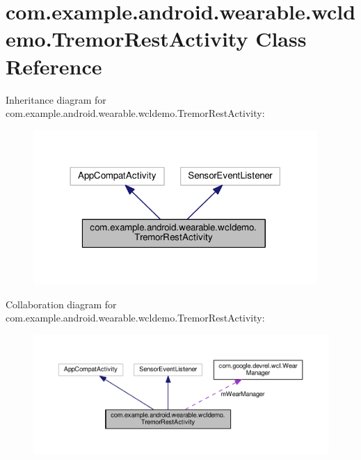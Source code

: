 \hypertarget{classcom_1_1example_1_1android_1_1wearable_1_1wcldemo_1_1TremorRestActivity}{}\section{com.\+example.\+android.\+wearable.\+wcldemo.\+Tremor\+Rest\+Activity Class Reference}
\label{classcom_1_1example_1_1android_1_1wearable_1_1wcldemo_1_1TremorRestActivity}


Inheritance diagram for com.\+example.\+android.\+wearable.\+wcldemo.\+Tremor\+Rest\+Activity\+:
\nopagebreak
\begin{figure}[H]
\begin{center}
\leavevmode
\includegraphics[width=306pt]{d7/d2a/classcom_1_1example_1_1android_1_1wearable_1_1wcldemo_1_1TremorRestActivity__inherit__graph}
\end{center}
\end{figure}


Collaboration diagram for com.\+example.\+android.\+wearable.\+wcldemo.\+Tremor\+Rest\+Activity\+:
\nopagebreak
\begin{figure}[H]
\begin{center}
\leavevmode
\includegraphics[width=350pt]{d9/d08/classcom_1_1example_1_1android_1_1wearable_1_1wcldemo_1_1TremorRestActivity__coll__graph}
\end{center}
\end{figure}
